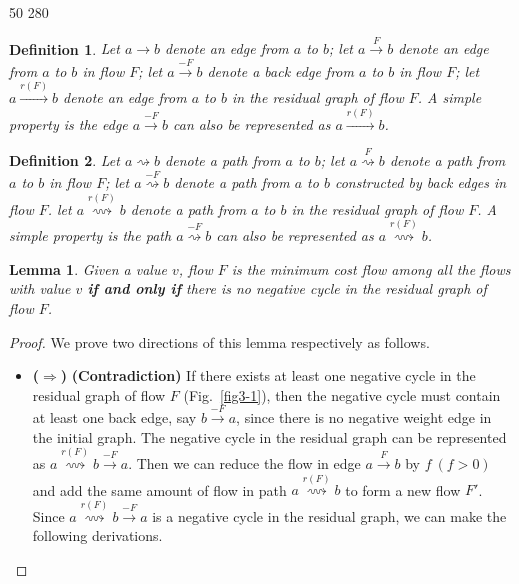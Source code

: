 \documentclass[12pt,a4paper]{article}
\newtheorem{lemma}[theorem]{Lemma}
\newtheorem{definition}{Definition}
\theoremstyle{definition}
\begin{document}
\begin{enumerate}
\begin{center}
{\begin{minipage}[t]{0.3\textwidth}
	50 280
\end{minipage}}
\end{center}
\hspace{1cm}
    \begin{definition}
    Let $a \rightarrow b$ denote an edge from $a$ to $b$; let $a \stackrel{F}{\rightarrow} b$ denote an edge from $a$ to $b$ in flow $F$; let $a \stackrel{-F}{\rightarrow} b$ denote a back edge from $a$ to $b$ in flow $F$; let $a \stackrel{r(F)}{\rightarrow} b$ denote an edge from $a$ to $b$ in the residual graph of flow $F$. A simple property is the edge $a \stackrel{-F}{\rightarrow} b$ can also be represented as $a \stackrel{r(F)}{\rightarrow} b$.
    \end{definition}
    \begin{definition}
    Let $a \rightsquigarrow b$ denote a path from $a$ to $b$; let $a \stackrel{F}{\rightsquigarrow} b$ denote a path from $a$ to $b$ in flow $F$; let $a \stackrel{-F}{\rightsquigarrow} b$ denote a path from $a$ to $b$ constructed by back edges in flow $F$. let $a \stackrel{r(F)}{\rightsquigarrow} b$ denote a path from $a$ to $b$ in the residual graph of flow $F$. A simple property is the path $a \stackrel{-F}{\rightsquigarrow} b$ can also be represented as $a \stackrel{r(F)}{\rightsquigarrow} b$.
    \end{definition}
    \begin{lemma}\label{lemma1}
    Given a value $v$, flow $F$ is the minimum cost flow among all the flows with value $v$ \textbf{if and only if} there is no negative cycle in the residual graph of flow $F$.
    \end{lemma}
    \begin{proof} We prove two directions of this lemma respectively as follows.
    \begin{itemize}
    \item \textbf{($\Longrightarrow$)} \textbf{(Contradiction)} If there exists at least one negative cycle in the residual graph of flow $F$ (Fig.~\ref{fig3-1}), then the negative cycle must contain at least one back edge, say $b \stackrel{-F}{\rightarrow} a$, since there is no negative weight edge in the initial graph. The negative cycle in the residual graph can be represented as $a \stackrel{r(F)}{\rightsquigarrow} b \stackrel{-F}{\rightarrow} a$. Then we can reduce the flow in edge $a \stackrel{F}{\rightarrow} b$ by $f\ (f > 0)$ and add the same amount of flow in path $a \stackrel{r(F)}{\rightsquigarrow} b$ to form a new flow $F'$. Since $a \stackrel{r(F)}{\rightsquigarrow} b \stackrel{-F}{\rightarrow} a$ is a negative cycle in the residual graph, we can make the following derivations.


\end{itemize}
\end{proof}
\end{enumerate}
\end{document}

